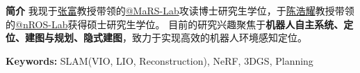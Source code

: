 %
%

\par{
{\textbf{简介}} 
我现于\href{https://mars.hku.hk/}{张富}教授带领的\href{https://mars.hku.hk/}{@MaRS-Lab}攻读博士研究生学位，于\href{http://nrs-lab.com//}{陈浩耀}教授带领的\href{http://nrs-lab.com/}{@nROS-Lab}获得硕士研究生学位。
目前的研究兴趣聚焦于\textbf{机器人自主系统、定位、建图与规划、隐式建图}，致力于实现高效的机器人环境感知定位。

\textbf{Keywords:} SLAM(VIO, LIO, Reconstruction), NeRF, 3DGS, Planning
}